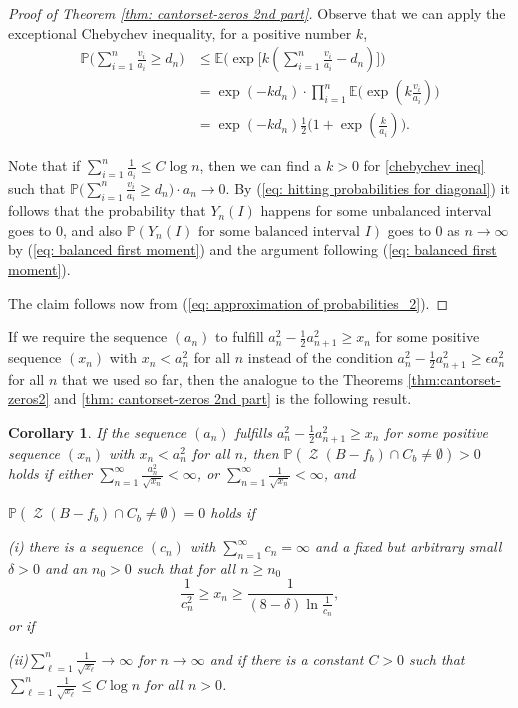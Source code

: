 \documentclass[11pt,reqno]{amsart}
\theoremstyle{plain}
\newtheorem{corollary}[theorem]{Corollary}
\theoremstyle{definition}
\theoremstyle{remark}
\begin{document}
\begin{proof}[Proof of Theorem \ref{thm: cantorset-zeros 2nd part}]
Observe that we can apply the exceptional Chebychev inequality, for a positive number $k$,
\begin{align}\label{chebychev ineq}
{\mathbb{P}} \big( \sum_{i=1}^{n} \frac {v_i} {a_i} \geq d_n \big) &\leq {\mathbb{E}} \Big( \exp \big[k(\sum_{i=1}^{n} \frac {v_i} {a_i} - d_n) \big] \Big)\\ \nonumber
&= \exp(-kd_n)\cdot \prod_{i=1}^{n} {\mathbb{E}} \big( \exp (k \frac {v_i} {a_i}) \big)\\ \nonumber
&= \exp(-kd_n) \frac 1 2 \big(1 + \exp ( \frac k {a_i}) \big).
\end{align}

Note that if $\sum_{i=1}^{n} \frac 1 {a_i} \leq C \log n$, then we can find a $k>0$ for \eqref{chebychev ineq} such that ${\mathbb{P}} \big( \sum_{i=1}^{n} \frac {v_i} {a_i} \geq d_n \big) \cdot a_n \to 0$. By (\ref{eq: hitting probabilities for diagonal}) it follows that the probability that $Y_n(I)$ happens for some unbalanced interval
goes to $0$,
 and also $\mathbb{P}(Y_n(I) \text{ for some balanced interval } I)$ goes to $0$ as $n \to \infty$ by (\ref{eq: balanced first moment}) and the argument following (\ref{eq: balanced first moment}).

The claim follows now from (\ref{eq: approximation of probabilities_2}).

\end{proof}

If we require the sequence $(a_n)$ to fulfill $a_n^2 - \frac{1}{2}a_{n+1}^2 \geq x_n$ for some positive sequence $(x_n)$ with $x_n< a_n^2$ for all $n$ instead of the condition $a_n^2 - \frac{1}{2}a_{n+1}^2 \geq \epsilon a_n^2$ for all $n$ that we used so far, then the analogue to the Theorems \ref{thm:cantorset-zeros2} and \ref{thm: cantorset-zeros 2nd part} is the following result.

\begin{corollary}\label{rm: condition on a_n's}
If the sequence $(a_n)$ fulfills $a_n^2 - \frac{1}{2}a_{n+1}^2 \geq x_n$ for some positive sequence $(x_n)$ with $x_n< a_n^2$ for all $n$, then
$\mathbb{P}(\operatorname{\mathcal{Z}}(B-f_b) \cap C_b \neq \emptyset)>0$ holds if either $\sum_{n=1}^{\infty} \frac{a^2_n}{\sqrt{x_n}} < \infty$, or $\sum_{n=1}^{\infty} \frac{1}{\sqrt{x_n}} < \infty$, and

$\mathbb{P}(\operatorname{\mathcal{Z}}(B-f_b) \cap C_b \neq \emptyset)=0$ holds if

(i) there is a sequence $(c_n)$ with $\sum_{n=1}^{\infty} c_n = \infty$ and a fixed but arbitrary small $\delta > 0$ and an $n_0>0$ such that for all $n \geq n_0$
\[ \frac{1}{c^2_n} \geq x_n \geq \frac{1}{(8-\delta)\ln{\frac{1}{c_n}}}, \]
or if

(ii)$\sum_{\ell = 1}^n \frac{1}{\sqrt{x_\ell}} \rightarrow \infty$ for $n \rightarrow \infty$ and if there is a constant $C>0$ such that $\sum_{\ell = 1}^n \frac{1}{\sqrt{x_\ell}} \leq C \log n$ for all $n>0$.
\end{corollary}
\end{document}
